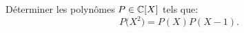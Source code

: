 \begin{exercice}
    Déterminer les polynômes $P \in \mathbb{C}[X]$ tels que:
    $$P\big(X^2\big) = P(X) P(X-1).$$
\end{exercice}